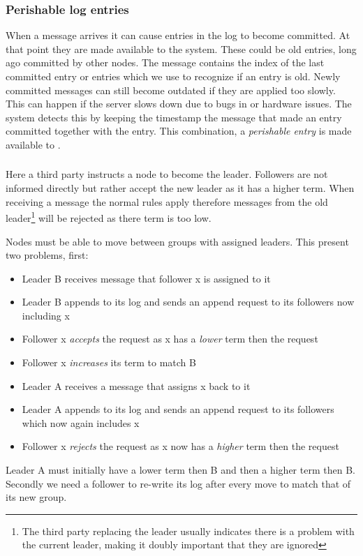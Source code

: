 \subsubsection*{Perishable log entries}
When a \raft{} message arrives it can cause entries in the log to become committed. At that point they are made available to the system. These could be old entries, long ago committed by other nodes. The message contains the index of the last committed entry or entries which we use to recognize if an entry is old. Newly committed messages can still become outdated if they are applied too slowly. This can happen if the server slows down due to bugs in \name{} or hardware issues. The system detects this by keeping the timestamp the message that made an entry committed together with the entry. This combination, a \textit{perishable entry} is made available to \name{}.

\subsubsection*{\graft{}} \label{sec:dictraft}
Here a third party instructs a node to become the leader. Followers are not informed directly but rather accept the new leader as it has a higher term. When receiving a message the normal \raft{} rules apply therefore messages from the old leader\footnote{The third party replacing the leader usually indicates there is a problem with the current leader, making it doubly important that they are ignored} will be rejected as there term is too low.

Nodes must be able to move between groups with assigned leaders. This present two problems, first:
\begin{itemize}
	\item Leader B receives message that follower x is assigned to it
	\item Leader B appends to its log and sends an append request to its followers now including x
	\item Follower x \emph{accepts} the request as x has a \emph{lower} term then the request
	\item Follower x \emph{increases} its term to match B
	\item Leader A receives a message that assigns x back to it
	\item Leader A appends to its log and sends an append request to its followers which now again includes x
	\item Follower x \emph{rejects} the request as x now has a \emph{higher} term then the request
\end{itemize}
Leader A must initially have a lower term then B and then a higher term then B. Secondly we need a follower to re-write its log after every move to match that of its new group. 

